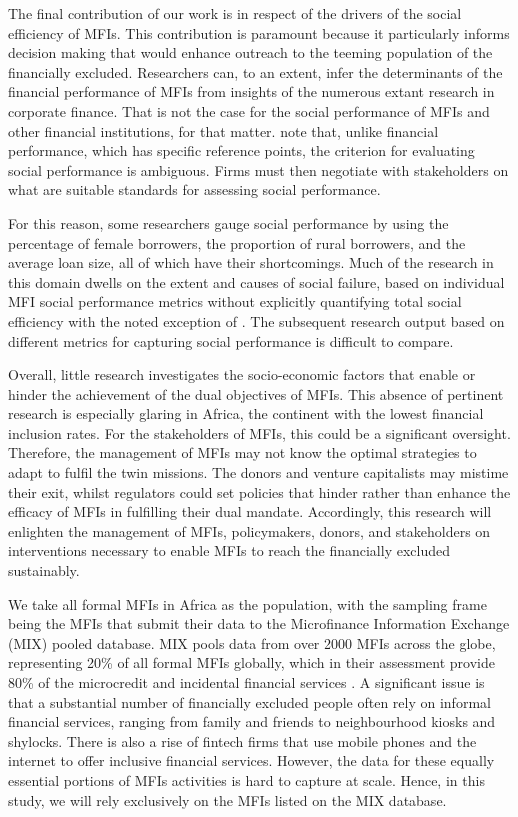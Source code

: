 \documentclass[a4paper, nobind]{templates/ociamthesis}
\begin{document}
The final contribution of our work is in respect of the drivers of the social efficiency of MFIs. This contribution is paramount because it particularly informs decision making that would enhance outreach to the teeming population of the financially excluded. Researchers can, to an extent, infer the determinants of the financial performance of MFIs from insights of the numerous extant research in corporate finance. That is not the case for the social performance of MFIs and other financial institutions, for that matter. \textcite{nason2018behavioral} note that, unlike financial performance, which has specific reference points, the criterion for evaluating social performance is ambiguous. Firms must then negotiate with stakeholders on what are suitable standards for assessing social performance.

For this reason, some researchers gauge social performance by using the percentage of female borrowers, the proportion of rural borrowers, and the average loan size, all of which have their shortcomings. Much of the research in this domain dwells on the extent and causes of social failure, based on individual MFI social performance metrics without explicitly quantifying total social efficiency \autocite{lebovics2016financial,louis2013profit,louis2013financial} with the noted exception of \textcite{gutierrez2009social}. The subsequent research output based on different metrics for capturing social performance is difficult to compare.

Overall, little research investigates the socio-economic factors that enable or hinder the achievement of the dual objectives of MFIs. This absence of pertinent research is especially glaring in Africa, the continent with the lowest financial inclusion rates. For the stakeholders of MFIs, this could be a significant oversight. Therefore, the management of MFIs may not know the optimal strategies to adapt to fulfil the twin missions. The donors and venture capitalists may mistime their exit, whilst regulators could set policies that hinder rather than enhance the efficacy of MFIs in fulfilling their dual mandate. Accordingly, this research will enlighten the management of MFIs, policymakers, donors, and stakeholders on interventions necessary to enable MFIs to reach the financially excluded sustainably.

We take all formal MFIs in Africa as the population, with the sampling frame being the MFIs that submit their data to the Microfinance Information Exchange (MIX) pooled database. MIX pools data from over 2000 MFIs across the globe, representing 20\% of all formal MFIs globally, which in their assessment provide 80\% of the microcredit and incidental financial services \autocite{market2017global}. A significant issue is that a substantial number of financially excluded people often rely on informal financial services, ranging from family and friends to neighbourhood kiosks and shylocks. There is also a rise of fintech firms that use mobile phones and the internet to offer inclusive financial services. However, the data for these equally essential portions of MFIs activities is hard to capture at scale. Hence, in this study, we will rely exclusively on the MFIs listed on the MIX database.
\end{document}
